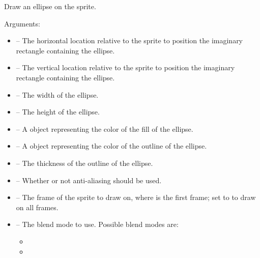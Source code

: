 \documentclass[letterpaper,10pt,english]{sphinxmanual}
\begin{document}
\begin{fulllineitems}
\label{gfx:sge.gfx.Sprite.draw_ellipse}
Draw an ellipse on the sprite.

Arguments:
\begin{itemize}
\item {} 
 -- The horizontal location relative to the sprite to
position the imaginary rectangle containing the ellipse.

\item {} 
 -- The vertical location relative to the sprite to
position the imaginary rectangle containing the ellipse.

\item {} 
 -- The width of the ellipse.

\item {} 
 -- The height of the ellipse.

\item {} 
 -- A {\hyperref[gfx:sge.gfx.Color]{\emph{}}} object representing the
color of the fill of the ellipse.

\item {} 
 -- A {\hyperref[gfx:sge.gfx.Color]{\emph{}}} object representing
the color of the outline of the ellipse.

\item {} 
 -- The thickness of the outline of the
ellipse.

\item {} 
 -- Whether or not anti-aliasing should be used.

\item {} 
 -- The frame of the sprite to draw on, where 
is the first frame; set to  to draw on all
frames.

\item {} 
 -- The blend mode to use.  Possible blend modes
are:
\begin{itemize}
\item {} 

\item {} 


\end{itemize}
\end{itemize}
\end{fulllineitems}
\end{document}
